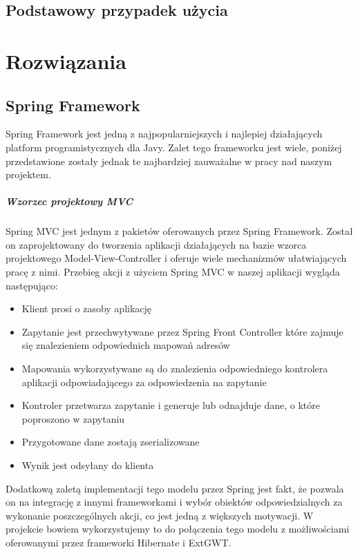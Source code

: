 \documentclass[licencjacka]{pracamgr}
\begin{document}
\section{Podstawowy przypadek użycia}

\chapter{Rozwiązania}
\section{Spring Framework}
Spring Framework jest jedną z najpopularniejszych i najlepiej działających platform programistycznych dla Javy. Zalet tego frameworku jest wiele, poniżej przedstawione zostały jednak te najbardziej zauważalne w pracy nad naszym projektem.

\paragraph{Wzorzec projektowy MVC}
Spring MVC jest jednym z pakietów oferowanych przez Spring Framework. Został on zaprojektowany do tworzenia aplikacji działających na bazie wzorca projektowego Model-View-Controller i oferuje wiele mechanizmów ułatwiających pracę z nimi. Przebieg akcji z użyciem Spring MVC w naszej aplikacji wygląda następująco:

\begin{itemize}
  \item Klient prosi o zasoby aplikację
  \item Zapytanie jest przechwytywane przez Spring Front Controller które zajmuje się znalezieniem odpowiednich mapowań adresów
  \item Mapowania wykorzystywane są do znalezienia odpowiedniego kontrolera aplikacji odpowiadającego za odpowiedzenia na zapytanie
  \item Kontroler przetwarza zapytanie i generuje lub odnajduje dane, o które poproszono w zapytaniu
  \item Przygotowane dane zostają zserializowane
  \item Wynik jest odsyłany do klienta
\end{itemize}

Dodatkową zaletą implementacji tego modelu przez Spring jest fakt, że pozwala on na integrację z innymi frameworkami i wybór obiektów odpowiedzialnych za wykonanie poszczególnych akcji, co jest jedną z większych motywacji. W projekcie bowiem wykorzystujemy to do połączenia tego modelu z możliwościami oferowanymi przez frameworki Hibernate i ExtGWT.
\end{document}
